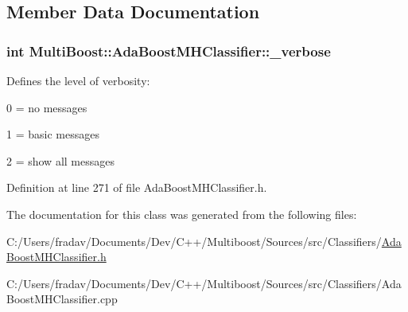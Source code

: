 \subsection{Member Data Documentation}
\hypertarget{classMultiBoost_1_1AdaBoostMHClassifier_a44a57b43a67952352ab59d9967e9e8b9}{
\subsubsection[{\-\_\-verbose}]{\setlength{\rightskip}{0pt plus 5cm}int Multi\-Boost\-::\-Ada\-Boost\-M\-H\-Classifier\-::\-\_\-verbose\hspace{0.3cm}{\ttfamily [protected]}}}\label{classMultiBoost_1_1AdaBoostMHClassifier_a44a57b43a67952352ab59d9967e9e8b9}
Defines the level of verbosity\-:
\begin{DoxyItemize}
\item 0 = no messages
\item 1 = basic messages
\item 2 = show all messages 
\end{DoxyItemize}

Definition at line 271 of file Ada\-Boost\-M\-H\-Classifier.\-h.



The documentation for this class was generated from the following files\-:\begin{DoxyCompactItemize}
\item 
C\-:/\-Users/fradav/\-Documents/\-Dev/\-C++/\-Multiboost/\-Sources/src/\-Classifiers/\hyperlink{AdaBoostMHClassifier_8h}{Ada\-Boost\-M\-H\-Classifier.\-h}\item 
C\-:/\-Users/fradav/\-Documents/\-Dev/\-C++/\-Multiboost/\-Sources/src/\-Classifiers/Ada\-Boost\-M\-H\-Classifier.\-cpp\end{DoxyCompactItemize}

